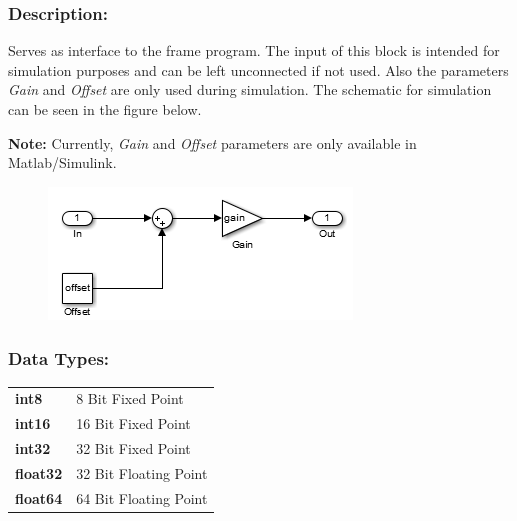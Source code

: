 \subsubsection*{Description:}
Serves as interface to the frame program. The input of this block is intended for simulation purposes and can be left unconnected if not used. Also the parameters \textit{Gain} and \textit{Offset} are only used during simulation. The schematic for simulation can be seen in the figure below.

\textbf{Note:} Currently, \textit{Gain} and \textit{Offset} parameters are only available in Matlab/Simulink.
\begin{figure}[H]
  \includegraphics{Inport_Schematic}
\end{figure} 

\subsubsection*{Data Types:}
\begin{tabular}{l l}
\textbf{int8} & 8 Bit Fixed Point\tabularnewline
\textbf{int16} & 16 Bit Fixed Point\tabularnewline
\textbf{int32} & 32 Bit Fixed Point\tabularnewline
\textbf{float32} & 32 Bit Floating Point\tabularnewline
\textbf{float64} & 64 Bit Floating Point\tabularnewline
\end{tabular}
